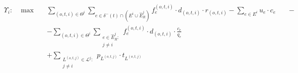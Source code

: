 \documentclass[review]{elsarticle}
\begin{document}
    \begin{align}
        &  \Upsilon_i: \hspace{10pt} \max  &&  \sum_{(o,t,i)\in \Theta^i} \sum_{e \in \delta^-(t)\cap (E^i\cup \widehat{E}_R^j)} f_e^{(o,t,i)} \cdot d_{(o,t,i)} \cdot r_{(o,t,i)} - \sum_{e\in E^i} u_{e}\cdot c_{e} \hspace{20pt} -  \nonumber  \label{eq:IterativeA}\\
        & 								  && - \sum_{(o,t,i) \in \Theta^i} \sum_{\substack{e \in \widehat{E}_R^j\colon \\ j\not = i}} f_e^{(o,t,i)} \cdot d_{(o,t,i)} \cdot \frac{c_e}{q_e}  \nonumber\\
        & 								  && + \sum_{\substack{L^{(o,t,j)} \in \mathcal{L}^j \colon \\ j\not = i}} p_{L^{(o,t,j)}} \cdot t_{L^{(o,t,j)}}
    \end{align}
\end{document}
